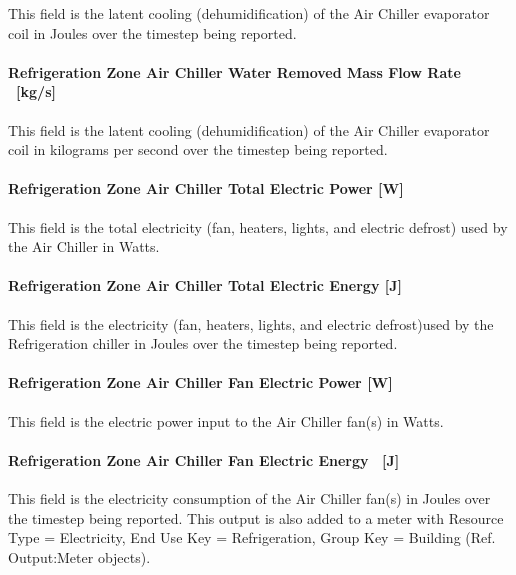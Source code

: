 This field is the latent cooling (dehumidification) of the Air Chiller evaporator coil in Joules over the timestep being reported.

\paragraph{Refrigeration Zone Air Chiller Water Removed Mass Flow Rate ~{[}kg/s{]}}\label{refrigeration-zone-air-chiller-water-removed-mass-flow-rate-kgs-1}

This field is the latent cooling (dehumidification) of the Air Chiller evaporator coil in kilograms per second over the timestep being reported.

\paragraph{Refrigeration Zone Air Chiller Total Electric Power {[}W{]}}\label{refrigeration-zone-air-chiller-total-electric-power-w}

This field is the total electricity (fan, heaters, lights, and electric defrost) used by the Air Chiller in Watts.

\paragraph{Refrigeration Zone Air Chiller Total Electric Energy {[}J{]}}\label{refrigeration-zone-air-chiller-total-electric-energy-j}

This field is the electricity (fan, heaters, lights, and electric defrost)used by the Refrigeration chiller in Joules over the timestep being reported.

\paragraph{Refrigeration Zone Air Chiller Fan Electric Power {[}W{]}}\label{refrigeration-zone-air-chiller-fan-electric-power-w}

This field is the electric power input to the Air Chiller fan(s) in Watts.

\paragraph{Refrigeration Zone Air Chiller Fan Electric Energy ~{[}J{]}}\label{refrigeration-zone-air-chiller-fan-electric-energy-j}

This field is the electricity consumption of the Air Chiller fan(s) in Joules over the timestep being reported. This output is also added to a meter with Resource Type = Electricity, End Use Key = Refrigeration, Group Key = Building (Ref. Output:Meter objects).

